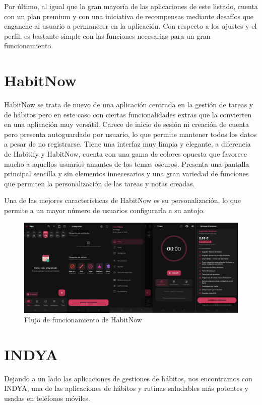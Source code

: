 Por último, al igual que la gran mayoría de las aplicaciones de este listado, cuenta con un plan premium y con una iniciativa de recompensas mediante desafíos que enganche al usuario a permanecer en la aplicación. Con respecto a los ajustes y el perfil, es bastante simple con las funciones necesarias para un gran funcionamiento.

\section{HabitNow}
HabitNow se trata de nuevo de una aplicación centrada en la gestión de tareas y de hábitos pero en este caso con ciertas funcionalidades extras que la convierten en una aplicación muy versátil. Carece de inicio de sesión ni creación de cuenta pero presenta autoguardado por usuario, lo que permite mantener todos los datos a pesar de no registrarse. Tiene una interfaz muy limpia y elegante, a diferencia de Habitify y HabitNow, cuenta con una gama de colores opuesta que favorece mucho a aquellos usuarios amantes de los temas oscuros. Presenta una pantalla principal sencilla y sin elementos innecesarios y una gran variedad de funciones que permiten la personalización de las tareas y notas creadas. 

Una de las mejores características de HabitNow es su personalización, lo que permite a un mayor número de usuarios configurarla a su antojo. 

\begin{figure}[h]
	\centering
	\includegraphics[width = 1\textwidth]{Imagenes/apps_images/habitnow.png}
	\caption{Flujo de funcionamiento de HabitNow}
	\label{fig:HabitNow}
\end{figure}


\section{INDYA}

Dejando a un lado las aplicaciones de gestiones de hábitos, nos encontramos con INDYA, una de las aplicaciones de hábitos y rutinas saludables más potentes y usadas en teléfonos móviles. 

